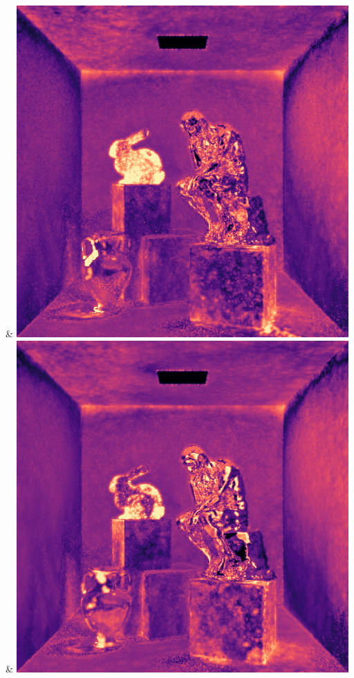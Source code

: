 & \includegraphics[width=\linewidth]{figures/py/tests/path_termination/bthk9+nee_1spp_thinker_flip.png}
& \includegraphics[width=\linewidth]{figures/py/tests/path_termination/1stdiff+nee_1spp_thinker_flip.png}
